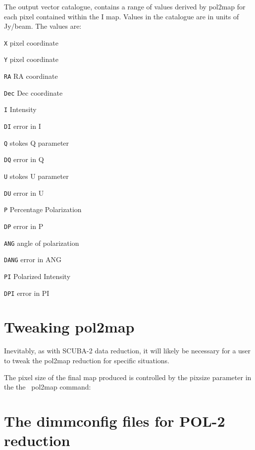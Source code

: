 The output vector catalogue, contains a range of values derived by pol2map for each pixel
contained within the I map. Values in the catalogue are in units of Jy/beam.
The values are:

\begin{aligndesc}
\item[\texttt{X}] pixel coordinate
\item[\texttt{Y}] pixel coordinate
\item[\texttt{RA}] RA coordinate
\item[\texttt{Dec}] Dec coordinate
\item[\texttt{I}] Intensity
\item[\texttt{DI}] error in I
\item[\texttt{Q}] stokes Q parameter
\item[\texttt{DQ}] error in Q
\item[\texttt{U}] stokes U parameter
\item[\texttt{DU}] error in U
\item[\texttt{P}] Percentage Polarization
\item[\texttt{DP}] error in P
\item[\texttt{ANG}] angle of polarization
\item[\texttt{DANG}] error in ANG
\item[\texttt{PI}] Polarized Intensity
\item[\texttt{DPI}] error in PI
\end{aligndesc}




\section{Tweaking pol2map}
\label{sec:pol2map-tweaks}

Inevitably, as with SCUBA-2 data reduction, it will likely be necessary for a user to
tweak the pol2map reduction for specific situations.

The pixel size of the final map produced is controlled by the pixsize
parameter in the the \smurf\ pol2map command:

\begin{terminalv}
\end{terminalv}



\section{The dimmconfig files for POL-2 reduction}
\label{sec:config}

